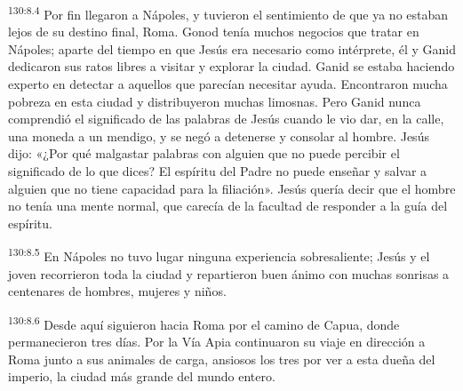 \par 
\textsuperscript{130:8.4} Por fin llegaron a Nápoles, y tuvieron el sentimiento de que ya no estaban lejos de su destino final, Roma. Gonod tenía muchos negocios que tratar en Nápoles; aparte del tiempo en que Jesús era necesario como intérprete, él y Ganid dedicaron sus ratos libres a visitar y explorar la ciudad. Ganid se estaba haciendo experto en detectar a aquellos que parecían necesitar ayuda. Encontraron mucha pobreza en esta ciudad y distribuyeron muchas limosnas. Pero Ganid nunca comprendió el significado de las palabras de Jesús cuando le vio dar, en la calle, una moneda a un mendigo, y se negó a detenerse y consolar al hombre. Jesús dijo: «¿Por qué malgastar palabras con alguien que no puede percibir el significado de lo que dices? El espíritu del Padre no puede enseñar y salvar a alguien que no tiene capacidad para la filiación». Jesús quería decir que el hombre no tenía una mente normal, que carecía de la facultad de responder a la guía del espíritu.

\par 
\textsuperscript{130:8.5} En Nápoles no tuvo lugar ninguna experiencia sobresaliente; Jesús y el joven recorrieron toda la ciudad y repartieron buen ánimo con muchas sonrisas a centenares de hombres, mujeres y niños.

\par 
\textsuperscript{130:8.6} Desde aquí siguieron hacia Roma por el camino de Capua, donde permanecieron tres días. Por la Vía Apia continuaron su viaje en dirección a Roma junto a sus animales de carga, ansiosos los tres por ver a esta dueña del imperio, la ciudad más grande del mundo entero.